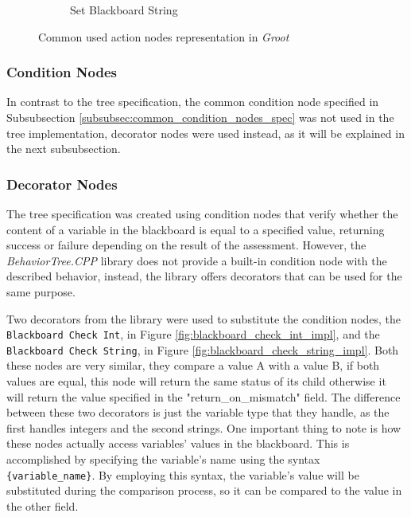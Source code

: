 \begin{figure}[!h]
\begin{subfigure}[b]{.32\linewidth}
        \caption{Set Blackboard String}
        \label{fig:set_blackboard_string_impl}
    \end{subfigure}
    \caption{Common used action nodes representation in \textit{Groot}}
    \label{fig:common_action_node_impl}
\end{figure}

\subsubsection{Condition Nodes}

In contrast to the tree specification, the common condition node specified in Subsubsection \ref{subsubsec:common_condition_nodes_spec} was not used in the tree implementation, decorator nodes were used instead, as it will be explained in the next subsubsection.

\subsubsection{Decorator Nodes}
\label{subsubsec:decator_nodes_impl}

The tree specification was created using condition nodes that verify whether the content of a variable in the blackboard is equal to a specified value, returning success or failure depending on the result of the assessment. However, the \textit{BehaviorTree.CPP} library does not provide a built-in condition node with the described behavior, instead, the library offers decorators that can be used for the same purpose.

Two decorators from the library were used to substitute the condition nodes, the \texttt{Blackboard Check Int}, in Figure \ref{fig:blackboard_check_int_impl}, and the \texttt{Blackboard Check String}, in Figure \ref{fig:blackboard_check_string_impl}. Both these nodes are very similar, they compare a value A with a value B, if both values are equal, this node will return the same status of its child otherwise it will return the value specified in the "return\_on\_mismatch" field. The difference between these two decorators is just the variable type that they handle, as the first handles integers and the second strings. One important thing to note is how these nodes actually access variables' values in the blackboard. This is accomplished by specifying the variable's name using the syntax \texttt{\{variable\_name\}}. By employing this syntax, the variable's value will be substituted during the comparison process, so it can be compared to the value in the other field.

